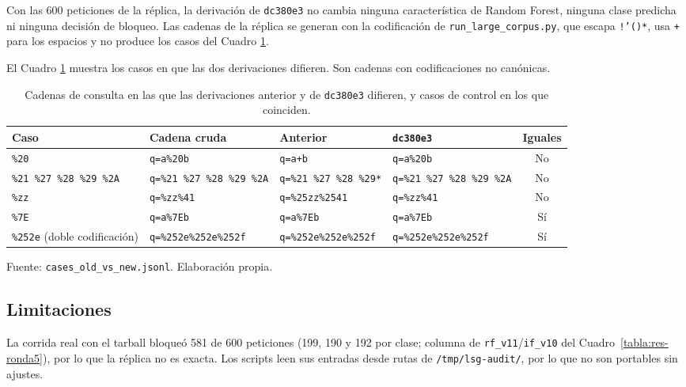 Con las 600 peticiones de la réplica, la derivación de \texttt{dc380e3} no cambia ninguna característica de Random Forest, ninguna clase predicha ni ninguna decisión de bloqueo. Las cadenas de la réplica se generan con la codificación de \texttt{run\_large\_corpus.py}, que escapa \texttt{!'()*}, usa \texttt{+} para los espacios y no produce los casos del Cuadro \ref{tabla:anexo-query-casos}.

El Cuadro \ref{tabla:anexo-query-casos} muestra los casos en que las dos derivaciones difieren. Son cadenas con codificaciones no canónicas.

\begin{table}[htbp]
\centering
\footnotesize
\begin{adjustbox}{max width=\linewidth}
\begin{tabular}{|l|l|l|l|c|}
\hline
\textbf{Caso} & \textbf{Cadena cruda} & \textbf{Anterior} & \textbf{\texttt{dc380e3}} & \textbf{Iguales} \\ \hline
\texttt{\%20} & \texttt{q=a\%20b} & \texttt{q=a+b} & \texttt{q=a\%20b} & No \\ \hline
\texttt{\%21\,\%27\,\%28\,\%29\,\%2A} & \texttt{q=\%21\,\%27\,\%28\,\%29\,\%2A} & \texttt{q=\%21\,\%27\,\%28\,\%29*} & \texttt{q=\%21\,\%27\,\%28\,\%29\,\%2A} & No \\ \hline
\texttt{\%zz} & \texttt{q=\%zz\%41} & \texttt{q=\%25zz\%2541} & \texttt{q=\%zz\%41} & No \\ \hline
\texttt{\%7E} & \texttt{q=a\%7Eb} & \texttt{q=a\%7Eb} & \texttt{q=a\%7Eb} & Sí \\ \hline
\texttt{\%252e} (doble codificación) & \texttt{q=\%252e\%252e\%252f} & \texttt{q=\%252e\%252e\%252f} & \texttt{q=\%252e\%252e\%252f} & Sí \\ \hline
\end{tabular}
\end{adjustbox}
\caption{Cadenas de consulta en las que las derivaciones anterior y de \texttt{dc380e3} difieren, y casos de control en los que coinciden.}
\label{tabla:anexo-query-casos}
\par\smallskip\footnotesize Fuente: \texttt{cases\_old\_vs\_new.jsonl}. Elaboración propia.
\end{table}

\subsection{Limitaciones}

La corrida real con el tarball bloqueó 581 de 600 peticiones (199, 190 y 192 por clase; columna de \texttt{rf\_v11}/\texttt{if\_v10} del Cuadro~\ref{tabla:res-ronda5}), por lo que la réplica no es exacta. Los scripts leen sus entradas desde rutas de \texttt{/tmp/lsg-audit/}, por lo que no son portables sin ajustes.

